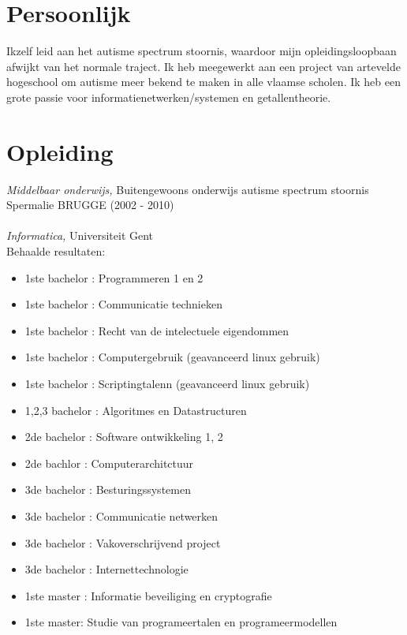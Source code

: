 \documentclass[margin, 10pt]{res} %
\begin{document}
\begin{resume}

 
\section{Persoonlijk}  
Ikzelf leid aan het autisme spectrum stoornis, waardoor mijn opleidingsloopbaan afwijkt van het normale traject. Ik heb meegewerkt aan een project van artevelde hogeschool om autisme meer bekend te maken in alle vlaamse scholen. Ik heb een grote passie voor informatienetwerken/systemen en getallentheorie.


\section{Opleiding}

{\sl Middelbaar onderwijs,} Buitengewoons onderwijs autisme spectrum stoornis \\
Spermalie BRUGGE (2002 - 2010)
\\ \\
{\sl Informatica,} Universiteit Gent \\
Behaalde resultaten:

\begin{itemize}
\item{1ste bachelor : Programmeren 1 en 2}
\item{1ste bachelor : Communicatie technieken}
\item{1ste bachelor : Recht van de intelectuele eigendommen}
\item{1ste bachelor : Computergebruik (geavanceerd linux gebruik)}
\item{1ste bachelor : Scriptingtalenn (geavanceerd linux gebruik)}
\item{1,2,3 bachelor : Algoritmes en Datastructuren}
\item{2de bachelor : Software ontwikkeling 1, 2}
\item{2de bachlor : Computerarchitctuur}
\item{3de bachelor : Besturingssystemen}
\item{3de bachelor : Communicatie netwerken}
\item{3de bachelor : Vakoverschrijvend project}
\item{3de bachelor : Internettechnologie}
\item{1ste master : Informatie beveiliging en cryptografie}
\item{1ste master: Studie van programeertalen en programeermodellen}
\end{itemize}
 

\end{resume}
\end{document}
